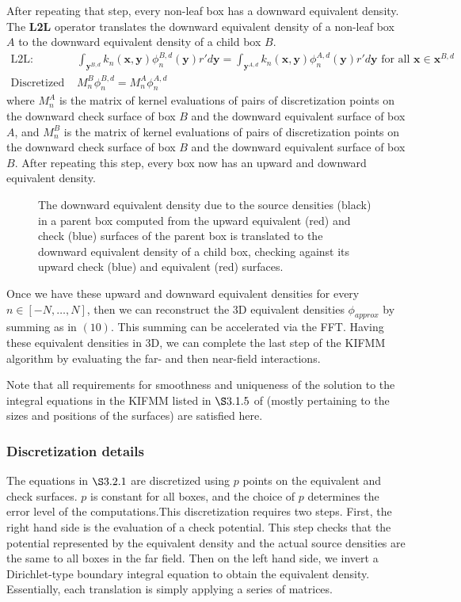 After repeating that step, every non-leaf box has a downward equivalent density. The \textbf{L2L} operator translates the downward equivalent density of a non-leaf box $A$ to the downward equivalent density of a child box $B$.
\begin{align}
\mbox{L2L: }&\int_{\mathbf{y}^{B,d}}{k_n(\mathbf{x},\mathbf{y})}\phi^{B,d}_n{(\mathbf{y})}r'd\mathbf{y}=\int_{\mathbf{y}^{A,d}}{k_n(\mathbf{x},\mathbf{y})}\phi^{A,d}_n{(\mathbf{y})}r'd\mathbf{y}\mbox{ for all }\mathbf{x}\in\mathbf{x}^{B,d}\\
\mbox{Discretized L2L: }&M_n^B\phi^{B,d}_n=M_n^A\phi^{A,d}_n
\end{align}
where $M_n^A$ is the matrix of kernel evaluations of pairs of discretization points on the downward check surface of box $B$ and the downward equivalent surface of box $A$, and $M_n^B$ is the matrix of kernel evaluations of pairs of discretization points on the downward check surface of box $B$ and the downward equivalent surface of box $B$. After repeating this step, every box now has an upward and downward equivalent density.

\begin{figure}[!ht]
\begin{center}
\end{center}
\caption{The downward equivalent density due to the source densities (black) in a parent box computed from the upward equivalent (red) and check (blue) surfaces of the parent box is translated to the downward equivalent density of a child box, checking against its upward check (blue) and equivalent (red) surfaces.}
\end{figure}

Once we have these upward and downward equivalent densities for every $n\in[-N,\dots,N]$, then we can reconstruct the 3D equivalent densities $\phi_{approx}$ by summing as in $(10)$. This summing can be accelerated via the FFT. Having these equivalent densities in 3D, we can complete the last step of the KIFMM algorithm by evaluating the far- and then near-field interactions.

Note that all requirements for smoothness and uniqueness of the solution to the integral equations in the KIFMM listed in $\S3.1.5$ of \cite{YBZ} (mostly pertaining to the sizes and positions of the surfaces) are satisfied here.

\subsubsection{Discretization details}
The equations in $\S3.2.1$ are discretized using $p$ points on the equivalent and check surfaces. $p$ is constant for all boxes, and the choice of $p$ determines the error level of the computations.This discretization requires two steps. First, the right hand side is the evaluation of a check potential. This step checks that the potential represented by the equivalent density and the actual source densities are the same to all boxes in the far field. Then on the left hand side, we invert a Dirichlet-type boundary integral equation to obtain the equivalent density. Essentially, each translation is simply applying a series of matrices.

